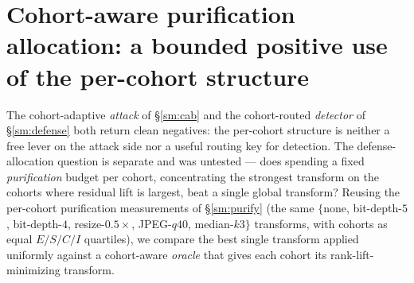 \section{Cohort-aware purification allocation: a bounded positive use of the per-cohort structure}
\label{sm:cohort-purify}

The cohort-adaptive \emph{attack} of \S\ref{sm:cab} and the cohort-routed \emph{detector} of \S\ref{sm:defense} both return clean negatives: the per-cohort structure is neither a free lever on the attack side nor a useful routing key for detection. The defense-allocation question is separate and was untested --- does spending a fixed \emph{purification} budget per cohort, concentrating the strongest transform on the cohorts where residual lift is largest, beat a single global transform? Reusing the per-cohort purification measurements of \S\ref{sm:purify} (the same $\{$none, bit-depth-$5$, bit-depth-$4$, resize-$0.5\times$, JPEG-$q40$, median-$k3\}$ transforms, with cohorts as equal $E/S/C/I$ quartiles), we compare the best single transform applied uniformly against a cohort-aware \emph{oracle} that gives each cohort its rank-lift-minimizing transform.

\begin{table}[t]
\centering
\caption{Cohort-aware (oracle) versus best-uniform input purification, computed on the per-cohort rank-lift data of \S\ref{sm:purify}. Lower residual rank-lift is a better defense. ``Best uniform'' is the single rank-lift-minimizing transform applied to all cohorts (including \emph{none} = no purification); ``cohort oracle'' gives each $E/S/C/I$ cohort its own minimizing transform under perfect routing. Gain is the relative reduction of the cohort oracle over the best uniform transform.}
\label{sm:tab:cohort-purify}
\small
{}
\end{table}

